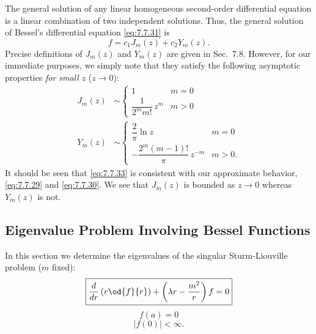 The general solution of any linear homogeneous second-order differential equation is a linear combination of two independent solutions.  Thus, the general solution of Bessel's differential equation \eqref{eq:7.7.31} is
\begin{equation}
\boxed{f = c_1 J_m(z) + c_2 Y_m(z).}
\label{eq:7.7.32}
\end{equation}
Precise definitions of $J_m(z)$ and $Y_m(z)$ are given in Sec.~7.8.  However, for our immediate purposes, we simply note that they satisfy the following asymptotic properties \emph{for small} $z$ ($z \to 0$):
\begin{equation}
\boxed{\begin{aligned}
J_m(z) &\sim \begin{cases} 1 & m = 0 \\ \dfrac{1}{2^m m!}\,z^m & m > 0 \end{cases} \\[10pt]
Y_m(z) &\sim \begin{cases} \dfrac{2}{\pi}\ln z & m = 0 \\[6pt] -\dfrac{2^m(m-1)!}{\pi}\,z^{-m} & m > 0. \end{cases}
\end{aligned}}
\label{eq:7.7.33}
\end{equation}
It should be seen that \eqref{eq:7.7.33} is consistent with our approximate behavior, \eqref{eq:7.7.29} and \eqref{eq:7.7.30}.  We see that $J_m(z)$ is bounded as $z \to 0$ whereas $Y_m(z)$ is not.

\subsection{Eigenvalue Problem Involving Bessel Functions}
\label{sec:7.7.7}

In this section we determine the eigenvalues of the singular Sturm-Liouville problem ($m$ fixed):
\begin{equation}
\boxed{\frac{d}{d r}\left(r\od{f}{r}\right) + \left(\lambda r - \frac{m^2}{r}\right)f = 0}
\label{eq:7.7.34}
\end{equation}
\begin{equation}
\boxed{f(a) = 0}
\label{eq:7.7.35}
\end{equation}
\begin{equation}
\boxed{|f(0)| < \infty.}
\label{eq:7.7.36}
\end{equation}

